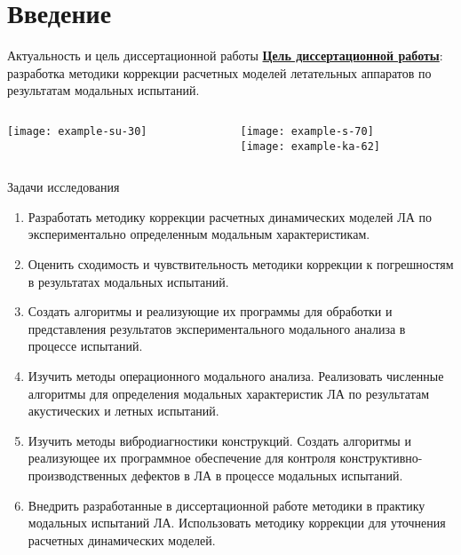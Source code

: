 
\begin{frame}
    \setcounter{framenumber}{1}
    \maketitle
\end{frame}

\section{Введение}

\begin{frame}{Актуальность и цель диссертационной работы}
	\textbf{\underline{Цель диссертационной работы}}: разработка методики коррекции расчетных моделей летательных аппаратов по результатам модальных испытаний.
	\vfill
	\begin{columns}
		\hfill
		\begin{column}{0.57\textwidth}
			\centering
			\texttt{[image: example-su-30]}	
		\end{column}
		\begin{column}{0.40\textwidth}
			\centering
			\texttt{[image: example-s-70]} \\ \vspace{0.5em}
			\texttt{[image: example-ka-62]}
		\end{column}
		\hfill
	\end{columns}	
\end{frame}

\begin{frame}{Задачи исследования}
	\begin{enumerate}
		\item Разработать методику коррекции расчетных динамических моделей ЛА по экспериментально определенным модальным характеристикам.
		\item Оценить сходимость и чувствительность методики коррекции к погрешностям в результатах модальных испытаний.
		\item Создать алгоритмы и реализующие их программы для обработки и представления результатов экспериментального модального анализа в процессе испытаний.
		\item Изучить методы операционного модального анализа. Реализовать численные алгоритмы для определения модальных характеристик ЛА по результатам акустических и летных испытаний.
		\item Изучить методы вибродиагностики конструкций. Создать алгоритмы и реализующее их программное обеспечение для контроля конструктивно-производственных дефектов в ЛА в процессе модальных испытаний.
		\item Внедрить разработанные в диссертационной работе методики в практику  модальных испытаний ЛА. Использовать методику коррекции для уточнения расчетных динамических моделей.
	\end{enumerate}
\end{frame}

